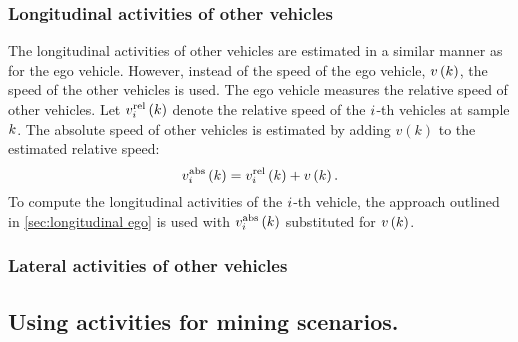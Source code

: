 


\subsubsection{Longitudinal activities of other vehicles}
\label{sec:longitudinal other vehicles}

The longitudinal activities of other vehicles are estimated in a similar manner as for the ego vehicle. However, instead of the speed of the ego vehicle, $v\left(k\right)$, the speed of the other vehicles is used. The ego vehicle measures the relative speed of other vehicles. Let $v_{i}^{\mathrm{rel}}\left(k\right)$ denote the relative speed of the $i$-th vehicles at sample $k$. The absolute speed of other vehicles is estimated by adding $v(k)$ to the estimated relative speed:
\begin{equation}
	v_{i}^{\mathrm{abs}}\left(k\right) = v_{i}^{\mathrm{rel}}\left(k\right) + v\left(k\right).
\end{equation}
To compute the longitudinal activities of the $i$-th vehicle, the approach outlined in \cref{sec:longitudinal ego} is used with $v_{i}^{\mathrm{abs}}\left(k\right)$ substituted for $v\left(k\right)$. 



\subsubsection{Lateral activities of other vehicles}
\label{sec:lateral other vehicles}

	
	
	
\subsection{Using activities for mining scenarios.}

